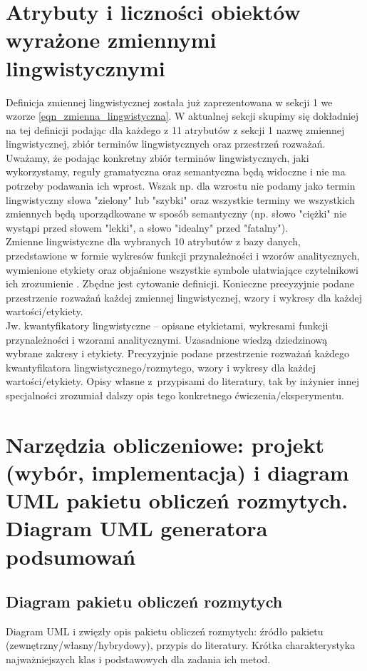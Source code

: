 \documentclass{classrep}
\begin{document}
\section{Atrybuty i liczności obiektów wyrażone zmiennymi lingwistycznymi}
Definicja zmiennej lingwistycznej została już zaprezentowana w sekcji 1 we wzorze \ref{eqn_zmienna_lingwistyczna}. W aktualnej sekcji skupimy się dokładniej na tej definicji podając dla każdego z 11 atrybutów z sekcji 1 nazwę zmiennej lingwistycznej, zbiór terminów lingwistycznych oraz przestrzeń rozważań. Uważamy, że podając konkretny zbiór terminów lingwistycznych, jaki wykorzystamy, reguły gramatyczna oraz semantyczna będą widoczne i nie ma potrzeby podawania ich wprost. Wszak np. dla wzrostu nie podamy jako termin lingwistyczny słowa "zielony" lub "szybki" oraz wszystkie terminy we wszystkich zmiennych będą uporządkowane w sposób semantyczny (np. słowo "ciężki" nie wystąpi przed słowem "lekki", a słowo "idealny" przed "fatalny").\\


Zmienne lingwistyczne dla wybranych 10 atrybutów z bazy danych, przedstawione w
formie wykresów funkcji przynależności i wzorów analitycznych, wymienione etykiety oraz objaśnione wszystkie
symbole ułatwiające czytelnikowi ich zrozumienie \cite{zadrozny06}. Zbędne jest
cytowanie definicji. Konieczne precyzyjnie podane przestrzenie rozważań każdej
zmiennej lingwistycznej, wzory i wykresy dla każdej wartości/etykiety.\\
Jw. kwantyfikatory lingwistyczne -- opisane etykietami, wykresami funkcji
przynależności i wzorami analitycznymi. Uzasadnione wiedzą dziedzinową wybrane
zakresy i etykiety. Precyzyjnie podane przestrzenie rozważań każdego kwantyfikatora 
lingwistycznego/rozmytego, wzory i wykresy dla każdej wartości/etykiety. Opisy własne z~przypisami do literatury, tak by inżynier innej specjalności zrozumiał dalszy
opis tego konkretnego ćwiczenia/eksperymentu. \\ 

\section{Narzędzia obliczeniowe: projekt (wybór, implementacja) i diagram UML pakietu obliczeń rozmytych. Diagram UML generatora podsumowań}
\subsection{Diagram pakietu obliczeń rozmytych}
Diagram UML i zwięzły opis pakietu obliczeń rozmytych: źródło pakietu
(zewnętrzny/własny/hybrydowy), przypis do literatury. Krótka charakterystyka
najważniejszych klas i podstawowych dla zadania ich metod. \\
\end{document}
